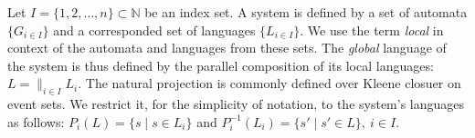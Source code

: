 \documentclass[a4paper, 10pt, conference]{ieeeconf}
\begin{document}
Let $I = \{1,2,\ldots,n\} \subset  \mathbb{N}$ be an index set. A system is
defined by a set of automata $\{G_{i \in I}\}$ and a corresponded set
of languages $\{L_{i \in I}\}$. We use the term \emph{local} in context
of the automata and languages from these sets. The \emph{global} language of the
system is thus defined by the parallel composition of its local languages: $L =
\parallel_{i \in I} L_i$.
The natural projection is commonly defined over Kleene closuer on event sets.
We restrict it, for the simplicity of notation, to the system's languages as
follows: $P_i(L) = \{s\mid s\in L_{i}\}$ and $P_i^{-1}(L_{i}) = \{s' \mid s' \in
L\}, ~i \in I$.



% 
\end{document}

